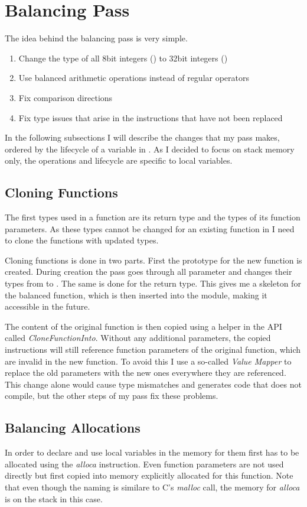 \section{Balancing Pass}
\label{pass}
The idea behind the balancing pass is very simple.
\begin{enumerate}
\item Change the type of all 8bit integers () to 32bit integers ()
\item Use balanced arithmetic operations instead of regular operators
\item Fix comparison directions
\item Fix type issues that arise in the instructions that have not been replaced
\end{enumerate}

In the following subsections I will describe the changes that my pass makes, ordered by the lifecycle of a variable in \ir{}.
As I decided to focus on stack memory only, the operations and lifecycle are specific to local variables.

\subsection{Cloning Functions}
The first types used in a function are its return type and the types of its function parameters.
As these types cannot be changed for an existing function in \llvm{} I need to clone the functions with updated types.

Cloning functions is done in two parts.
First the prototype for the new function is created.
During creation the pass goes through all parameter and changes their types from  to .
The same is done for the return type.
This gives me a skeleton for the balanced function, which is then inserted into the module, making it accessible in the future.

The content of the original function is then copied using a helper in the \llvm{} API called \emph{CloneFunctionInto}.
Without any additional parameters, the copied instructions will still reference function parameters of the original function, which are invalid in the new function.
To avoid this I use a so-called \emph{Value Mapper} to replace the old parameters with the new ones everywhere they are referenced.
This change alone would cause type mismatches and generates code that does not compile, but the other steps of my pass fix these problems.

\subsection{Balancing Allocations}
In order to declare and use local variables in \ir{} the memory for them first has to be allocated using the \emph{alloca} instruction.
Even function parameters are not used directly but first copied into memory explicitly allocated for this function.
Note that even though the naming is similare to C's \emph{malloc} call, the memory for \emph{alloca} is on the stack in this case.

